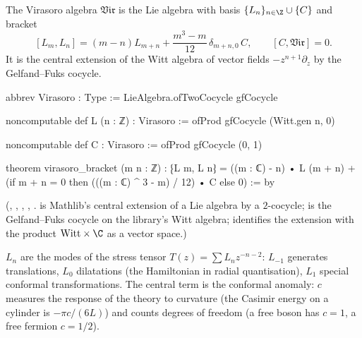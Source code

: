 \begin{definition}\label{l07:def:vir}
The Virasoro algebra $\mathfrak{Vir}$ is the Lie algebra with basis $\{L_n\}_{n\in\Z}\cup\{C\}$ and
bracket
\begin{equation}\label{l07:eq:vir}
 [L_m,L_n] = (m-n)L_{m+n} + \frac{m^3-m}{12}\,\delta_{m+n,0}\,C,\qquad [C,\mathfrak{Vir}] = 0 .
\end{equation}
It is the central extension of the Witt algebra of vector fields $-z^{n+1}\partial_z$ by the
Gelfand--Fuks cocycle.
\end{definition}
\begin{leancode}
abbrev Virasoro : Type := LieAlgebra.ofTwoCocycle gfCocycle

noncomputable def L (n : ℤ) : Virasoro := ofProd gfCocycle (Witt.gen n, 0)

noncomputable def C : Virasoro := ofProd gfCocycle (0, 1)

theorem virasoro_bracket (m n : ℤ) :
    ⁅L m, L n⁆ = ((m : ℂ) - n) • L (m + n)
      + (if m + n = 0 then (((m : ℂ) ^ 3 - m) / 12) • C else 0) := by
\end{leancode}
(, , , ,
.  is Mathlib's central
extension of a Lie algebra by a $2$-cocycle;  is the Gelfand--Fuks cocycle on the
library's Witt algebra;  identifies the extension with the product
$\mathrm{Witt}\times\C$ as a vector space.)

\begin{physics}
$L_n$ are the modes of the stress tensor $T(z)=\sum L_nz^{-n-2}$: $L_{-1}$ generates translations, $L_0$
dilatations (the Hamiltonian in radial quantisation), $L_1$ special conformal transformations. The central
term is the conformal anomaly: $c$ measures the response of the theory to curvature (the Casimir energy on
a cylinder is $-\pi c/(6L)$) and counts degrees of freedom (a free boson has $c=1$, a free fermion $c=1/2$).
\end{physics}

